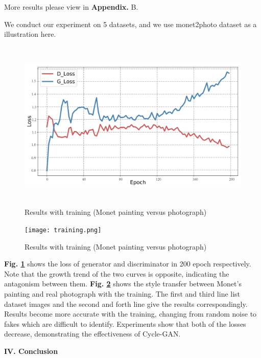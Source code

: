 \documentclass[a4paper]{article}
\begin{document}
\large{More results please view in \textbf{Appendix.} B.

We conduct our experiment on 5 datasets, and we use monet2photo dataset as a illustration here.

\vspace{3mm}
\begin{figure}[H]
\centering
\includegraphics[width=13.5cm,height=8.2cm]{losses.pdf}
\caption{Results with training (Monet painting versus photograph)}
\label{losses}
\end{figure}
\vspace{2mm}

\vspace{3mm}
\begin{figure}[H]
\centering
\texttt{[image: training.png]}
\caption{Results with training (Monet painting versus photograph)}
\label{resultswithtraining}
\end{figure}
\vspace{2mm}

\textbf{Fig. \ref{losses} }shows the loss of generator and discriminator in 200 epoch respectively. Note that the growth trend of the two curves is opposite, indicating the antagonism between them. \textbf{Fig. \ref{resultswithtraining} }shows the style transfer between Monet's painting and real photograph with the training. The first and third line list dataset images and the second and forth line give the results correspondingly. Results become more accurate with the training, changing from random noise to fakes which are difficult to identify. Experiments show that both of the losses decrease, demonstrating the effectiveness of \textsf{Cycle-GAN}.


} 

\vspace{15mm}
\begin{center}
\LARGE\textbf{IV. Conclusion} \\
\end{center}
\vspace{2mm}
\end{document}
